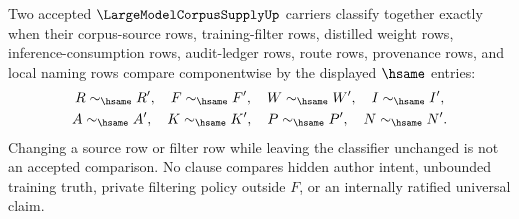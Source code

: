 \begin{definition}
\label{def:large-model-corpus-supply-classifier}
Two accepted $\LargeModelCorpusSupplyUp$ carriers classify together exactly when their corpus-source rows, training-filter rows, distilled weight rows, inference-consumption rows, audit-ledger rows, route rows, provenance rows, and local naming rows compare componentwise by the displayed $\hsame$ entries:
$$
\begin{gathered}
R\sim_{\hsame}R',\quad F\sim_{\hsame}F',\quad W\sim_{\hsame}W',\quad I\sim_{\hsame}I',\\
A\sim_{\hsame}A',\quad K\sim_{\hsame}K',\quad P\sim_{\hsame}P',\quad N\sim_{\hsame}N'.
\end{gathered}
$$
Changing a source row or filter row while leaving the classifier unchanged is not an accepted comparison. No clause compares hidden author intent, unbounded training truth, private filtering policy outside $F$, or an internally ratified universal claim.
\end{definition}


